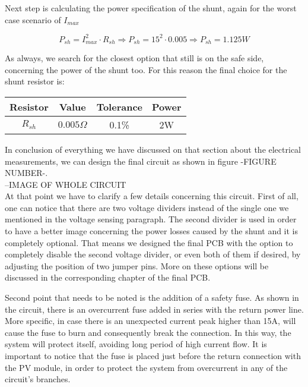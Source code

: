 Next step is calculating the power specification of the shunt, again for the worst case scenario of $I_{max}$

\begin{equation}
P_{sh} = I_{max}^2 \cdot R_{sh} \Rightarrow P_{sh} = 15^2 \cdot 0.005 \Rightarrow P_{sh} = 1.125W
\label{eqn:Ps_calculation}
\end{equation}

As always, we search for the closest option that still is on the safe side, concerning the power of the shunt too. For this reason the final choice for the shunt resistor is:

\begin{center}
\begin{tabular}{ c c c c } 
 Resistor & Value & Tolerance & Power \\ \hline
 $R_{sh}$ & $0.005\Omega$ & 0.1\% & 2W \\ 
\end{tabular}
\end{center}

In conclusion of everything we have discussed on that section about the electrical measurements, we can design the final circuit as shown in figure -FIGURE NUMBER-.\\

--IMAGE OF WHOLE CIRCUIT\\

At that point we have to clarify a few details concerning this circuit. First of all, one can notice that there are two voltage dividers instead of the single one we mentioned in the voltage sensing paragraph. The second divider is used in order to have a better image concerning the power losses caused by the shunt and it is completely optional. That means we designed the final PCB with the option to completely disable the second voltage divider, or even both of them if desired, by adjusting the position of two jumper pins. More on these options will be discussed in the corresponding chapter of the final PCB.

Second point that needs to be noted is the addition of a safety fuse. As shown in the circuit, there is an overcurrent fuse added in series with the return power line. More specific, in case there is an unexpected current peak higher than 15A, will cause the fuse to burn and consequently break the connection. In this way, the system will protect itself, avoiding long period of high current flow. It is important to notice that the fuse is placed just before the return connection with the PV module, in order to protect the system from overcurrent in any of the circuit's branches.

